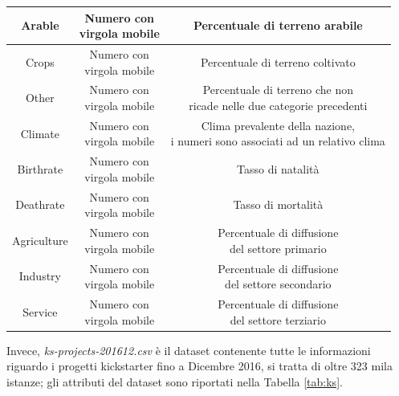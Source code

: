 \begin{table}
\begin{tabular}{|c|c|c|}
		\hline  
		\rule{0pt}{24pt}Arable & \shortstack{Numero con \\ virgola mobile} & Percentuale di terreno arabile \\ 
		\hline  
		\rule{0pt}{24pt}Crops & \shortstack{Numero con \\ virgola mobile} & Percentuale di terreno coltivato \\ 
		\hline  
		\rule{0pt}{24pt}Other & \shortstack{Numero con \\ virgola mobile} & \shortstack{Percentuale di terreno che non\\ ricade nelle due categorie precedenti} \\ 
		\hline  
		\rule{0pt}{24pt}Climate & \shortstack{Numero con \\ virgola mobile} & \shortstack{Clima prevalente della nazione, \\ i numeri sono associati ad un relativo clima}  \\ 
		\hline  
		\rule{0pt}{24pt}Birthrate & \shortstack{Numero con \\ virgola mobile} & Tasso di natalità \\ 
		\hline  
		\rule{0pt}{24pt}Deathrate & \shortstack{Numero con \\ virgola mobile} & Tasso di mortalità \\ 
		\hline  
		\rule{0pt}{24pt}Agriculture & \shortstack{Numero con \\ virgola mobile} & \shortstack{Percentuale di diffusione \\ del settore primario} \\ 
		\hline  
		\rule{0pt}{24pt}Industry & \shortstack{Numero con \\ virgola mobile} & \shortstack{Percentuale di diffusione \\ del settore secondario} \\ 
		\hline   
		\rule{0pt}{24pt}Service & \shortstack{Numero con \\ virgola mobile} & \shortstack{Percentuale di diffusione \\ del settore terziario} \\ 
		\hline  
	\end{tabular}
\end{table} 
Invece, \textit{ks-projects-201612.csv} è il dataset contenente tutte le informazioni riguardo i progetti kickstarter fino a Dicembre 2016, si tratta di oltre 323 mila istanze; gli attributi del dataset sono riportati nella Tabella \ref{tab:ks}.
